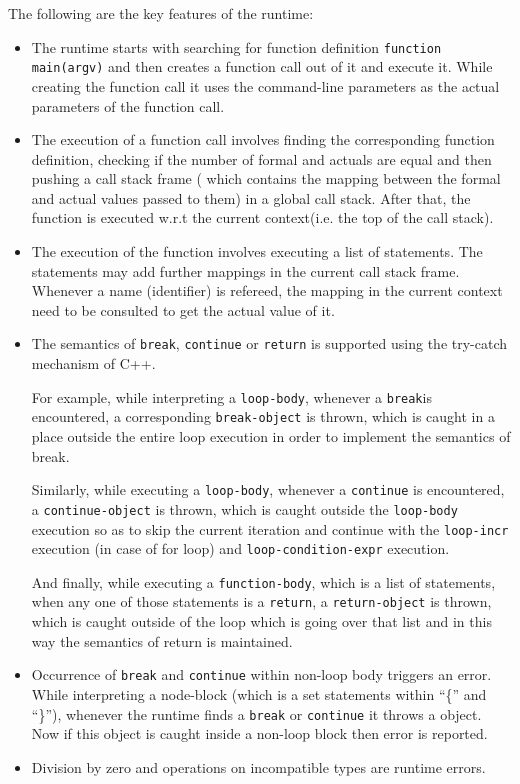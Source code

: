 The following are the key features of the runtime:
\begin{itemize}
  \item The runtime starts with searching for function definition
  {\tt function main(argv)} and then creates a function call out of it and 
  execute it.  While creating the function call it uses the command-line 
  parameters as the actual parameters of the function call.

  \item The execution of a function call involves finding the corresponding 
  function definition, checking if the number of formal and actuals are equal 
  and then pushing a call stack frame ( which contains the mapping between the 
      formal and actual values passed to them) in a global call stack. After 
  that, the function
  is executed w.r.t the current context(i.e. the top of the call stack).

  \item The execution of the function involves executing a list of statements.
  The statements may add further mappings in the current call stack frame.
  Whenever a name (identifier) is refereed, the mapping in the current context 
  need to be consulted to get the actual value of it. 

  \item The semantics of {\tt break}, {\tt continue} or 
{\tt return} is supported using the try-catch mechanism of C++.

  For example, while interpreting a {\tt loop-body}, whenever a 
{\tt break}is encountered, a corresponding {\tt break-object} is 
thrown, which is caught in a place outside the entire loop execution in order to 
implement the semantics of break. 

  Similarly, while executing a {\tt loop-body}, whenever a 
{\tt continue} is encountered, a {\tt continue-object} is thrown, 
  which is caught outside
  the {\tt loop-body} execution so as to skip the current iteration and 
  continue with the {\tt loop-incr} execution (in case of for loop) and 
{\tt loop-condition-expr} execution.

  And finally, while executing a  {\tt function-body}, which is a list
  of statements, when any one of those statements is a {\tt return}, a 
{\tt return-object} is thrown, which is caught outside of the loop
  which is going over that list and in this way the semantics of return is 
  maintained.
  
  \item Occurrence of {\tt break} and {\tt continue} within non-loop
    body triggers an error. While interpreting a node-block (which is a set 
        statements within ``\{'' and ``\}''), whenever the runtime finds a 
{\tt break} or  {\tt continue} it throws a object. Now if this 
object is caught
  inside a non-loop block then error is reported.

  \item Division by zero and operations on incompatible types are runtime 
  errors.  
  
  \end{itemize}

